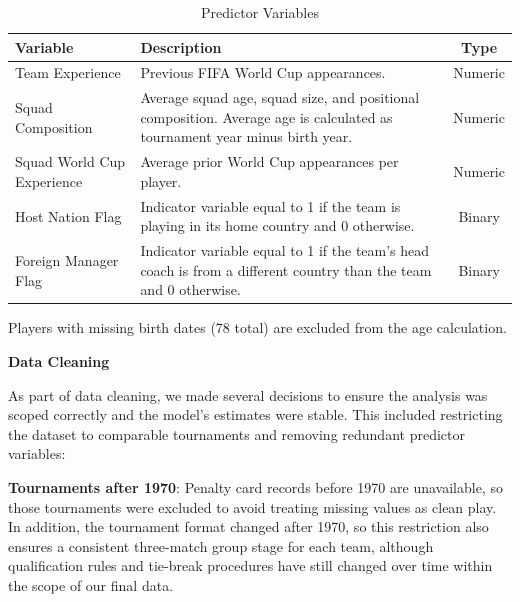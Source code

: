 \documentclass{article}
\begin{document}
\begin{table}[H]
\centering
\caption{Predictor Variables}
\label{tab:predictors}


\begin{threeparttable}
\renewcommand{\arraystretch}{1.25}
\begin{tabularx}{\textwidth}{@{} l X c @{}}
\toprule
\textbf{Variable} & \textbf{Description} & \textbf{Type} \\
\midrule
Team Experience & Previous FIFA World Cup appearances. & Numeric \\

Squad Composition & Average squad age, squad size, and positional composition. Average age is calculated as tournament year minus birth year.\tnote{a} & Numeric \\

Squad World Cup Experience & Average prior World Cup appearances per player. & Numeric \\


Host Nation Flag & Indicator variable equal to 1 if the team is playing in its home country and 0 otherwise. & Binary \\

Foreign Manager Flag & Indicator variable equal to 1 if the team's head coach is from a different country than the team and 0 otherwise. & Binary \\

\bottomrule
\end{tabularx}
\begin{tablenotes}
\footnotesize
\item[a] Players with missing birth dates (78 total) are excluded from the age calculation.
\end{tablenotes}
\end{threeparttable}
\end{table}

\vspace{1.2em}
\textbf{\large Data Cleaning}

As part of data cleaning, we made several decisions to ensure the analysis was scoped correctly and the model's estimates were stable. This included restricting the dataset to comparable tournaments and removing redundant predictor variables:


\textbf{Tournaments after 1970}: Penalty card records before 1970 are unavailable, so those tournaments were excluded to avoid treating missing values as clean play. In addition, the tournament format changed after 1970, so this restriction also ensures a consistent three-match group stage for each team, although qualification rules and tie-break procedures have still changed over time within the scope of our final data.
\end{document}
